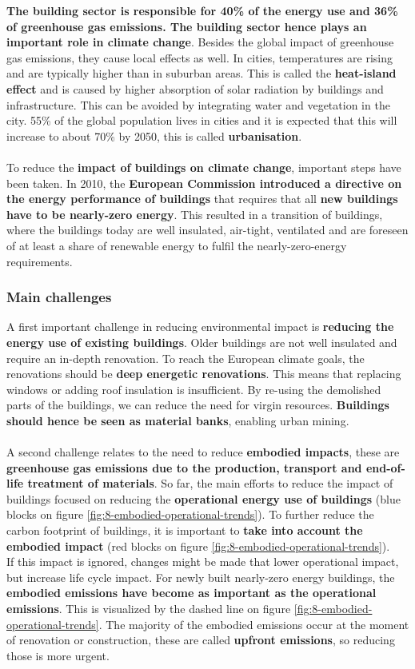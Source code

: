 \documentclass[../summary.tex]{subfiles}
\begin{document}
	\textbf{The building sector is responsible for 40\% of the energy use and 36\% of greenhouse gas emissions. The building sector hence plays an important role in climate change}. Besides the global impact of greenhouse gas emissions, they cause local effects as well. In cities, temperatures are rising and are typically higher than in suburban areas. This is called the \textbf{heat-island effect} and is caused by higher absorption of solar radiation by buildings and infrastructure. This can be avoided by integrating water and vegetation in the city. 55\% of the global population lives in cities and it is expected that this will increase to about 70\% by 2050, this is called \textbf{urbanisation}.
	\\\\	
	To reduce the \textbf{impact of buildings on climate change}, important steps have been taken. In 2010, the \textbf{European Commission introduced a directive on the energy performance of buildings} that requires that all \textbf{new buildings have to be nearly-zero energy}. This resulted in a transition of buildings, where the buildings today are well insulated, air-tight, ventilated and are foreseen of at least a share of renewable energy to fulfil the nearly-zero-energy requirements. 
	
	\subsubsection{Main challenges}
	
	A first important challenge in reducing environmental impact is \textbf{reducing the energy use of existing buildings}. Older buildings are not well insulated and require an in-depth renovation. To reach the European climate goals, the renovations should be \textbf{deep energetic renovations}. This means that replacing windows or adding roof insulation is insufficient. By re-using the demolished parts of the buildings, we can reduce the need for virgin resources. \textbf{Buildings should hence be seen as material banks}, enabling urban mining.
	\\\\
	A second challenge relates to the need to reduce \textbf{embodied impacts}, these are \textbf{greenhouse gas emissions due to the production, transport and end-of-life treatment of materials}. So far, the main efforts to reduce the impact of buildings focused on reducing the \textbf{operational energy use of buildings} (blue blocks on figure \ref{fig:8-embodied-operational-trends}). To further reduce the carbon footprint of buildings, it is important to \textbf{take into account the embodied impact} (red blocks on figure \ref{fig:8-embodied-operational-trends}). \\
	If this impact is ignored, changes might be made that lower operational impact, but increase life cycle impact. For newly built nearly-zero energy buildings, the \textbf{embodied emissions have become as important as the operational emissions}. This is visualized by the dashed line on figure \ref{fig:8-embodied-operational-trends}. The majority of the embodied emissions occur at the moment of renovation or construction, these are called \textbf{upfront emissions}, so reducing those is more urgent.
	
\end{document}

